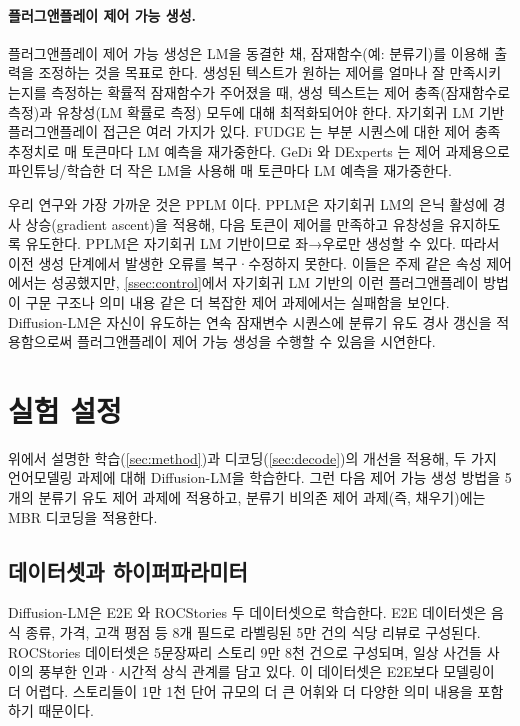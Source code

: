 \documentclass{article}
\begin{document}
\paragraph{플러그앤플레이 제어 가능 생성.}
플러그앤플레이 제어 가능 생성은 LM을 동결한 채, 잠재함수(예: 분류기)를 이용해 출력을 조정하는 것을 목표로 한다. 생성된 텍스트가 원하는 제어를 얼마나 잘 만족시키는지를 측정하는 확률적 잠재함수가 주어졌을 때, 생성 텍스트는 제어 충족(잠재함수로 측정)과 유창성(LM 확률로 측정) 모두에 대해 최적화되어야 한다.
자기회귀 LM 기반 플러그앤플레이 접근은 여러 가지가 있다.
FUDGE \cite{yang-klein-2021-fudge}는 부분 시퀀스에 대한 제어 충족 추정치로 매 토큰마다 LM 예측을 재가중한다.
GeDi \cite{KrauseGeDi2020}와 DExperts \cite{liu-etal-2021-dexperts}는 제어 과제용으로 파인튜닝/학습한 더 작은 LM을 사용해 매 토큰마다 LM 예측을 재가중한다.


우리 연구와 가장 가까운 것은 PPLM \cite{Dathathri2020Plug}이다. PPLM은 자기회귀 LM의 은닉 활성에 경사 상승(gradient ascent)을 적용해, 다음 토큰이 제어를 만족하고 유창성을 유지하도록 유도한다.
PPLM은 자기회귀 LM 기반이므로 좌→우로만 생성할 수 있다. 따라서 이전 생성 단계에서 발생한 오류를 복구·수정하지 못한다.
이들은 주제 같은 속성 제어에서는 성공했지만, \cref{ssec:control}에서 자기회귀 LM 기반의 이런 플러그앤플레이 방법이 구문 구조나 의미 내용 같은 더 복잡한 제어 과제에서는 실패함을 보인다. Diffusion-LM은 자신이 유도하는 연속 잠재변수 시퀀스에 분류기 유도 경사 갱신을 적용함으로써 플러그앤플레이 제어 가능 생성을 수행할 수 있음을 시연한다.





\newcommand{\Length}{Length\xspace}
\newcommand{\Spans}{Syntax Spans\xspace} 
\newcommand{\POS}{Parts-of-speech\xspace}
\newcommand{\Syntax}{Syntax Tree\xspace} 
\newcommand{\Content}{Semantic Content\xspace} 

\section{실험 설정}
위에서 설명한 학습(\cref{sec:method})과 디코딩(\cref{sec:decode})의 개선을 적용해, 두 가지 언어모델링 과제에 대해 Diffusion-LM을 학습한다. 그런 다음 제어 가능 생성 방법을 5개의 분류기 유도 제어 과제에 적용하고, 분류기 비의존 제어 과제(즉, 채우기)에는 MBR 디코딩을 적용한다.

\label{sec:setup}
\subsection{데이터셋과 하이퍼파라미터}
Diffusion-LM은 E2E \cite{novikova-etal-2017-e2e}와 ROCStories \cite{mostafazadeh-etal-2016-corpus} 두 데이터셋으로 학습한다. E2E 데이터셋은 음식 종류, 가격, 고객 평점 등 8개 필드로 라벨링된 5만 건의 식당 리뷰로 구성된다.
ROCStories 데이터셋은 5문장짜리 스토리 9만 8천 건으로 구성되며, 일상 사건들 사이의 풍부한 인과·시간적 상식 관계를 담고 있다.
이 데이터셋은 E2E보다 모델링이 더 어렵다. 스토리들이 1만 1천 단어 규모의 더 큰 어휘와 더 다양한 의미 내용을 포함하기 때문이다.
\end{document}
